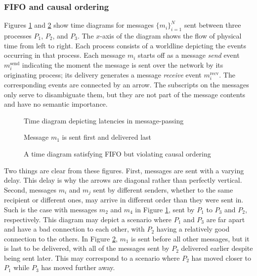 \documentclass[]             %
{NASA}                       %
\theoremstyle{definition}
\begin{document}
\subsubsection{FIFO and causal ordering}

Figures \ref{fig:message-latencies} and \ref{fig:message-latencies2}
show time diagrams for messages $\{m_i\}_{i=1}^N$ sent between three
processes $P_1$, $P_2$, and $P_3$. The $x$-axis of the diagram shows
the flow of physical time from left to right. Each process consists of
a worldline depicting the events occurring in that process. Each
message $m_i$ starts off as a message \emph{send} event
$m_i^\textrm{send}$ indicating the moment the message is sent over the
network by its originating process; its delivery generates a message
\emph{receive} event $m_i^\textrm{recv}$. The corresponding events are
connected by an arrow.  The subscripts on the messages only serve to
disambiguate them, but they are not part of the message contents and
have no semantic importance.

\begin{figure}[p]
  \centering 
  \caption{Time diagram depicting latencies in message-passing}
  \label{fig:message-latencies}
\end{figure}

\begin{figure}[p]
  \centering 
  \caption{Message $m_1$ is sent first and delivered last}
  \label{fig:message-latencies2}
\end{figure}

\begin{figure}[p]
  \centering 
  \caption{A time diagram satisfying FIFO but violating causal ordering}
  \label{fig:message-latencies3}
\end{figure}

\afterpage{\clearpage}


Two things are clear from these figures. First, messages are sent with
a varying delay. This delay is why the arrows are diagonal rather than
perfectly vertical. Second, messages $m_i$ and $m_j$ sent by different
senders, whether to the same recipient or different ones, may arrive
in different order than they were sent in. Such is the case with
messages $m_2$ and $m_4$ in Figure \ref{fig:message-latencies}, sent
by $P_1$ to $P_3$ and $P_2$, respectively. This diagram may depict a
scenario where $P_1$ and $P_3$ are far apart and have a bad connection
to each other, with $P_2$ having a relatively good connection to the
others. In Figure \ref{fig:message-latencies2}, $m_1$ is sent before
all other messages, but it is last to be delivered, with all of the
messages sent by $P_2$ delivered earlier despite being sent
later. This may correspond to a scenario where $P_2$ has moved closer
to $P_1$ while $P_3$ has moved further away.
\end{document}
